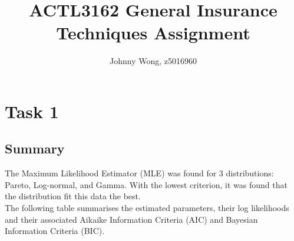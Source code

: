 \documentclass{article}
\title{ACTL3162 General Insurance Techniques Assignment}
\author{Johnny Wong, z5016960}
\begin{document}
	\maketitle
	
	\section{Task 1}
	\subsection{Summary}
	The Maximum Likelihood Estimator (MLE) was found for 3 distributions: Pareto, Log-normal, and Gamma. With the lowest criterion, it was found that the     distribution fit this data the best.\\
	
	The following table summarises the estimated parameters, their log likelihoods and their associated Aikaike Information Criteria (AIC) and Bayesian Information Criteria (BIC).
	
\end{document}
